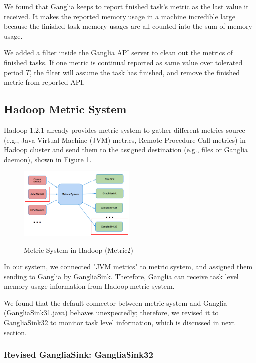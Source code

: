 We found that Ganglia keeps to report finished task's metric as the last value it received. It makes the reported memory usage in a machine incredible large because the finished task memory usages are all counted into the sum of memory usage.

We added a filter inside the Ganglia API server to clean out the metrics of finished tasks. If one metric is continual reported as same value over tolerated period $T$, the filter will assume the task has finished, and remove the finished metric from reported API.

\subsection{Hadoop Metric System}

Hadoop 1.2.1 already provides metric system to gather different metrics source (e.g., Java Virtual Machine (JVM) metrics, Remote Procedure Call metrics) in Hadoop cluster and send them to the assigned destination (e.g., files or Ganglia daemon), shown in Figure \ref{figure-metric2}.

\begin{figure}[h!]
  \caption{Metric System in Hadoop (Metric2)}
  \centering
    \includegraphics[width=0.5\textwidth]{image/ganglia32}
    \label{figure-metric2}
\end{figure}

In our system, we connected "JVM metrics" to metric system, and assigned them sending to Ganglia by GangliaSink. Therefore, Ganglia can receive task level memory usage information from Hadoop metric system.

We found that the default connector between metric system and Ganglia (GangliaSink31.java) behaves unexpectedly; therefore, we revised it to GangliaSink32 to monitor task level information, which is discussed in next section.

\subsubsection{Revised GangliaSink: GangliaSink32}

